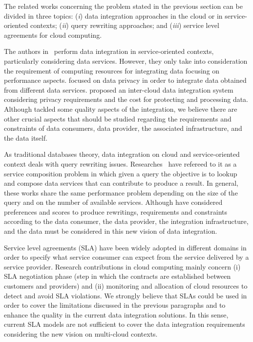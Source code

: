 The related works concerning the problem stated in the previous section can be divided in three topics: (\textit{i}) data integration approaches in the cloud or in service-oriented contexts; (\textit{ii}) query rewriting approaches; and (\textit{iii}) service level agreements for cloud computing.

The authors in~\cite{Correndo2010,ElSheikh2013} perform data integration in service-oriented contexts, particularly considering data services. However, they only take into consideration the requirement of computing resources for integrating data focusing on performance aspects. \cite{YauY08} focused on data privacy in order to integrate data obtained from different data services. \cite{Tian2010} proposed an inter-cloud data integration system considering privacy requirements and the cost for protecting and processing data. Although \cite{YauY08,Tian2010} tackled some quality aspects of the integration, we believe there are other crucial aspects that should be studied regarding the requirements and constraints of data consumers, data provider, the associated infrastructure, and the data itself.

As traditional databases theory, data integration on cloud and service-oriented context deals with query rewriting issues. Researches~\cite{ba2014,Barhamgi2010,Benouaret2011,Umberto} have refereed to it as a service composition problem in which given a query the objective is to lookup and compose data services that can contribute to produce a result. In general, these works share the same performance problem depending on the size of the query and on the number of available services. Although \cite{ba2014,Benouaret2011} have considered preferences and scores to produce rewritings, requirements and constraints according to the data consumer, the data provider, the integration infrastructure, and the data must be considered in this new vision of data integration. 

Service level agreements (SLA) have been widely adopted in different domains in order to specify what service consumer can expect from the service delivered by a service provider. Research contributions in cloud computing mainly concern (i) SLA negotiation phase (step in which the contracts are established between customers and providers) and (ii) monitoring and allocation of cloud resources to detect and avoid SLA violations. We strongly believe that SLAs could be used in order to cover the limitations discussed in the previous paragraphs and to enhance the quality in the current data integration solutions. In this sense, current SLA models are not sufficient to cover the data integration requirements considering the new vision on multi-cloud contexts.

